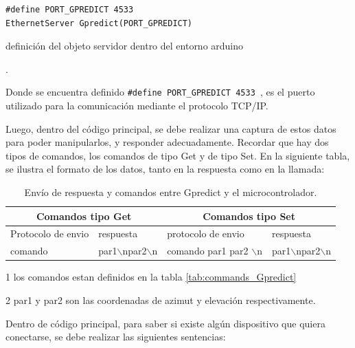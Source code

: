 \begin{listing}[h!]
	\begin{verbatim}
#define PORT_GPREDICT 4533 
EthernetServer Gpredict(PORT_GPREDICT)
	\end{verbatim}
\vspace{-10mm}
\caption{definición del objeto servidor dentro del entorno arduino}. 
\label{cod:obj_serv_gpr}
\end{listing}

Donde se encuentra definido \texttt{#define PORT_GPREDICT 4533 }, es el puerto utilizado para la comunicación mediante el protocolo TCP/IP.

Luego, dentro del código principal, se debe realizar una captura de estos datos para poder manipularlos, y responder adecuadamente. Recordar que hay dos tipos de comandos, los comandos de tipo Get y de tipo Set. En la siguiente tabla, se ilustra el formato de los datos, tanto en la respuesta como en la llamada: 
\begin{table}[ht]
	\centering
 \begin{threeparttable}	
	\begin{tabular}{|p{2.0cm}|p{2.0cm}|p{2.0cm}|p{2.0cm}|} 
		\hline
		\multicolumn{2}{|c|}{Comandos tipo Get} &\multicolumn{2}{c|}{Comandos tipo Set}  
		\\ \hline 
		Protocolo de envio & respuesta & protocolo de envio & respuesta \\ \hline 
		comando\tnote{1} & par1$\backslash$npar2$\backslash$n & 
		comando\tnote{1} par1\tnote{2} par2\tnote{2}  $\backslash$n & par1$\backslash$npar2$\backslash$n  \\ 
		\hline 
	\end{tabular}
	\begin{tablenotes}
		\item [1] los comandos estan definidos en la tabla \ref{tab:commands_Gpredict}   
		\item [2] par1 y par2 son las coordenadas de azimut y elevación respectivamente.  
		
	\end{tablenotes}


\end{threeparttable}
	\caption{Envío de respuesta y comandos entre Gpredict y el microcontrolador.}
	\label{tab:protocol_tx_gpr}
\end{table}


Dentro de código principal, para saber si existe algún dispositivo que quiera conectarse, se debe realizar las siguientes sentencias: 

